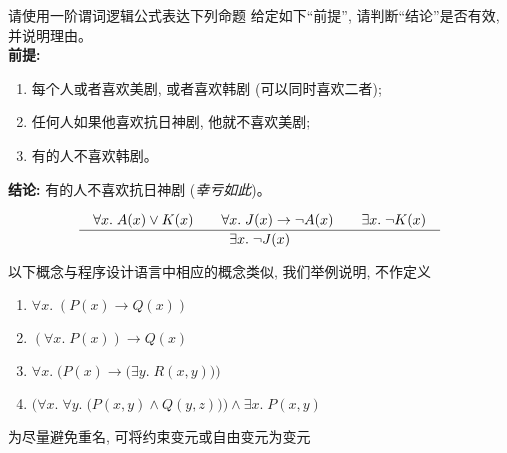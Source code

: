 \begin{frame}{}
  \begin{exampleblock}{请使用一阶谓词逻辑公式表达下列命题}
    给定如下``前提'', 请判断``结论''是否有效, 并说明理由。\\[10pt]
    {\bf 前提:}
    \begin{enumerate}[(1)]
      \item 每个人或者喜欢美剧, 或者喜欢韩剧 (可以同时喜欢二者);
      \item 任何人如果他喜欢抗日神剧, 他就不喜欢美剧;
      \item 有的人不喜欢韩剧。
    \end{enumerate}

    \vspace{0.20cm}
    {\bf 结论:} 有的人不喜欢抗日神剧 ({\it 幸亏如此})。
  \end{exampleblock}

  \pause
  \vspace{0.50cm}
  \[
    \frac{\quad\forall x.\; A(x) \lor K(x) \qquad
      \forall x.\; J(x) \to \lnot A(x) \qquad
      \exists x.\; \lnot K(x)\quad}{\quad\exists x.\; \lnot J(x)\quad}
  \]
\end{frame}

\begin{frame}{}
  \begin{center}
    以下概念与程序设计语言中相应的概念类似, 我们举例说明, 不作定义
  \end{center}

  \begin{definition}
    \begin{enumerate}[(1)]
      \setlength{\itemsep}{6pt}
      \item $\forall x.\; (P(x) \to Q(x))$
      \item $(\forall x.\; P(x)) \to Q(x)$
      \item $\forall x.\; \Big(P(x) \to \big(\exists y.\; R(x, y)\big)\Big)$
      \item $\Big(\forall x.\; \forall y.\; \big(P(x, y) \land Q(y, z)\big)\Big) \land \exists x.\; P(x, y)$
    \end{enumerate}
  \end{definition}

  \pause
  \vspace{0.30cm}
  \begin{definition}[改名 (Rename)]
    为尽量避免重名, 可将约束变元或自由变元为变元
  \end{definition}
\end{frame}

